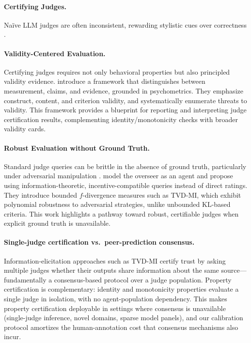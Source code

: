 \documentclass{article}
\begin{document}
\paragraph{Certifying Judges.}
Naïve LLM judges are often inconsistent, rewarding stylistic cues over correctness \citep{Kocmi2024HumanVsLLM,Li2024TrustLLMJudgments}.

\paragraph{Validity-Centered Evaluation.}
Certifying judges requires not only behavioral properties but also principled validity evidence. \citet{salaudeen2025measurement} introduce a framework that distinguishes between measurement, claims, and evidence, grounded in psychometrics. They emphasize construct, content, and criterion validity, and systematically enumerate threats to validity. This framework provides a blueprint for reporting and interpreting judge certification results, complementing identity/monotonicity checks with broader validity cards.

\paragraph{Robust Evaluation without Ground Truth.}
Standard judge queries can be brittle in the absence of ground truth, particularly under adversarial manipulation \citep{Zhuo2024ICEScore,TongZhang2024CodeJudge}. \citet{robertson2025stepbystep} model the overseer as an agent and propose using information-theoretic, incentive-compatible queries instead of direct ratings. They introduce bounded $f$-divergence measures such as TVD-MI, which exhibit polynomial robustness to adversarial strategies, unlike unbounded KL-based criteria. This work highlights a pathway toward robust, certifiable judges when explicit ground truth is unavailable.

\paragraph{Single-judge certification vs.\ peer-prediction consensus.}
Information-elicitation approaches such as TVD-MI \citep{robertson2025stepbystep} certify trust by asking multiple judges whether their outputs share information about the same source---fundamentally a consensus-based protocol over a judge population.
Property certification is complementary: identity and monotonicity properties evaluate a single judge in isolation, with no agent-population dependency.
This makes property certification deployable in settings where consensus is unavailable (single-judge inference, novel domains, sparse model panels), and our calibration protocol amortizes the human-annotation cost that consensus mechanisms also incur.
\end{document}

